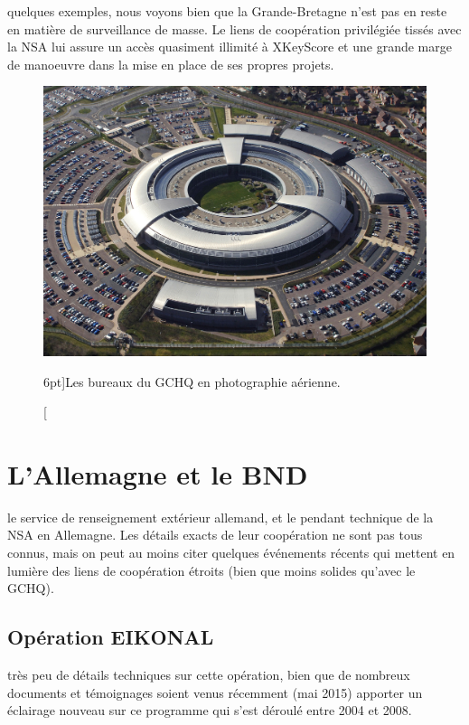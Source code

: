  quelques exemples, nous voyons bien que la
Grande-Bretagne n'est pas en reste en matière de surveillance de masse. Le liens
de coopération privilégiée tissés avec la NSA lui assure un accès quasiment
illimité à XKeyScore et une grande marge de manoeuvre dans la mise en place de
ses propres projets.

\vspace{0.8cm}
\begin{figure}
\includegraphics{gchq.jpg}
\caption[Les bureaux du GCHQ en photographie aérienne][6pt]{Les bureaux du GCHQ en photographie aérienne.}
\label{fig:gchq}
\end{figure}

\newpage
\section{L'Allemagne et le BND}

 le service de
renseignement extérieur allemand, et le pendant technique de la NSA en
Allemagne. Les détails exacts de leur coopération ne sont pas tous connus, mais
on peut au moins citer quelques événements récents qui mettent en lumière des
liens de coopération étroits (bien que moins solides qu'avec le GCHQ).

\subsection{Opération EIKONAL}

 très peu de détails techniques sur cette
opération, bien que de nombreux documents et témoignages soient venus récemment
(mai 2015) apporter un éclairage nouveau sur ce programme qui s'est déroulé entre 2004 et
2008.


